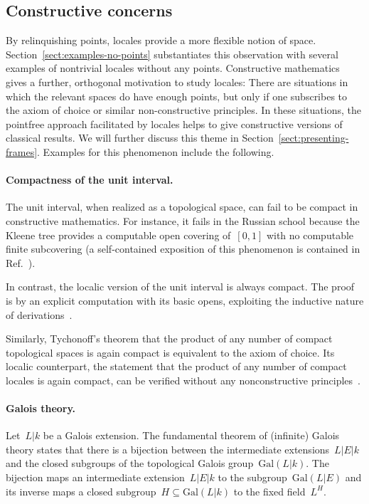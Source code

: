 \documentclass{ws-rv9x6}
\newcommand{\Gal}{\mathrm{Gal}}
\renewcommand{\_}{\mathpunct{.}}
\newcommand{\?}{\,{:}\,}
\begin{document}
\subsection{Constructive concerns}

By relinquishing points, locales provide a more flexible notion of space.
Section~\ref{sect:examples-no-points} substantiates this observation
with several examples of nontrivial locales without any points. Constructive
mathematics gives a further, orthogonal motivation to study locales: There are
situations in which the relevant spaces do have enough points, but only if one
subscribes to the axiom of choice or similar non-constructive principles. In
these situations, the pointfree approach facilitated by locales helps to give
constructive versions of classical results. We will further discuss this theme
in Section~\ref{sect:presenting-frames}. Examples for this phenomenon include
the following.

\paragraph{Compactness of the unit interval.} The unit interval, when realized
as a topological space, can fail to be compact in constructive
mathematics. For instance, it fails in the Russian school because the Kleene
tree provides a computable open covering of~$[0,1]$ with no computable finite
subcovering (a self-contained exposition of this phenomenon is contained in
Ref.~).

In contrast, the localic version of the unit interval is always compact. The
proof is by an explicit computation with its basic opens, exploiting the inductive
nature of derivations~\cite{cederquist-negri:heine-borel}.

Similarly, Tychonoff's theorem that the product of any number of compact
topological spaces is again compact is equivalent to the axiom of choice. Its
localic counterpart, the statement that the product of any number of compact
locales is again compact, can be verified without any nonconstructive
principles~\cite{vickers:tychonoff}.

\paragraph{Galois theory.} Let~$L|k$ be a Galois extension. The
fundamental theorem of (infinite) Galois theory states that there is a bijection between
the intermediate extensions~$L|E|k$ and the closed subgroups of the topological
Galois group~$\Gal(L|k)$. The bijection maps an intermediate extension~$L|E|k$
to the subgroup~$\Gal(L|E)$ and its inverse maps a closed subgroup~$H \subseteq
\Gal(L|k)$ to the fixed field~$L^H$.
\end{document}
